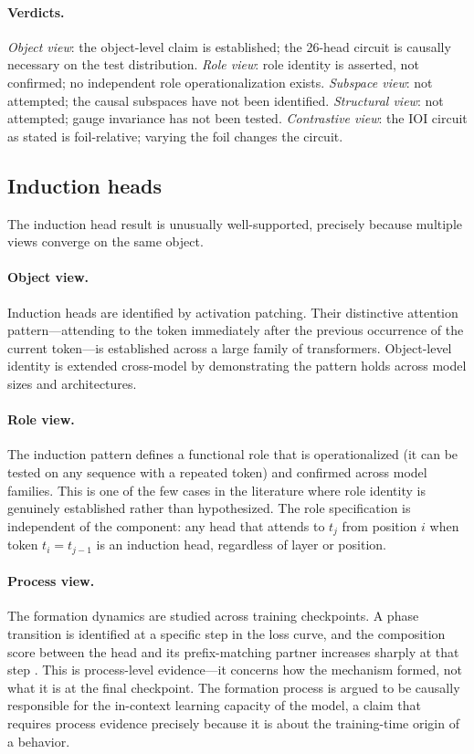 \documentclass{article}
\begin{document}
\paragraph{Verdicts.}
\emph{Object view}: the object-level claim is established; the 26-head
circuit is causally necessary on the test distribution.
\emph{Role view}: role identity is asserted, not confirmed; no
independent role operationalization exists.
\emph{Subspace view}: not attempted; the causal subspaces have not been
identified.
\emph{Structural view}: not attempted; gauge invariance has not been
tested.
\emph{Contrastive view}: the IOI circuit as stated is foil-relative;
varying the foil changes the circuit.

\subsection{Induction heads}

The induction head result \citep{olsson2022} is unusually well-supported,
precisely because multiple views converge on the same object.

\paragraph{Object view.}
Induction heads are identified by activation patching.  Their distinctive
attention pattern---attending to the token immediately after the previous
occurrence of the current token---is established across a large family
of transformers.  Object-level identity is extended cross-model by
demonstrating the pattern holds across model sizes and architectures.

\paragraph{Role view.}
The induction pattern defines a functional role that is operationalized
(it can be tested on any sequence with a repeated token) and confirmed
across model families.  This is one of the few cases in the literature
where role identity is genuinely established rather than hypothesized.
The role specification is independent of the component: any head that
attends to $t_{j}$ from position $i$ when token $t_i = t_{j-1}$ is an
induction head, regardless of layer or position.

\paragraph{Process view.}
The formation dynamics are studied across training checkpoints.  A
phase transition is identified at a specific step in the loss curve,
and the composition score between the head and its prefix-matching
partner increases sharply at that step \citep{olsson2022}.  This is
process-level evidence---it concerns how the mechanism formed, not
what it is at the final checkpoint.  The formation process is argued
to be causally responsible for the in-context learning capacity of the
model, a claim that requires process evidence precisely because it is
about the training-time origin of a behavior.
\end{document}
